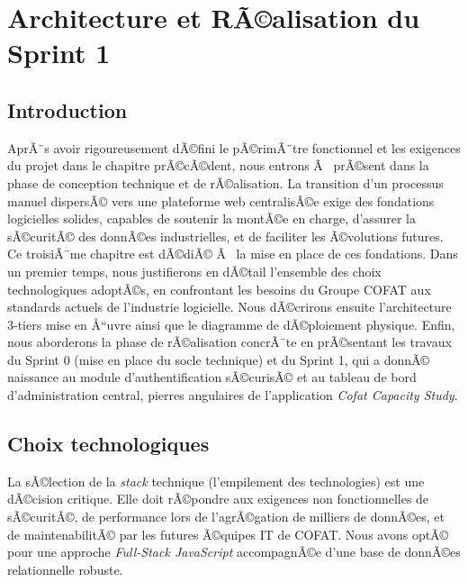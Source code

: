 ﻿\chapter{Architecture et RÃ©alisation du Sprint 1}
\label{chap:architecture_sprint1}

\section{Introduction}
AprÃ¨s avoir rigoureusement dÃ©fini le pÃ©rimÃ¨tre fonctionnel et les exigences du projet dans le chapitre prÃ©cÃ©dent, nous entrons Ã  prÃ©sent dans la phase de conception technique et de rÃ©alisation. La transition d'un processus manuel dispersÃ© vers une plateforme web centralisÃ©e exige des fondations logicielles solides, capables de soutenir la montÃ©e en charge, d'assurer la sÃ©curitÃ© des donnÃ©es industrielles, et de faciliter les Ã©volutions futures. Ce troisiÃ¨me chapitre est dÃ©diÃ© Ã  la mise en place de ces fondations. Dans un premier temps, nous justifierons en dÃ©tail l'ensemble des choix technologiques adoptÃ©s, en confrontant les besoins du Groupe COFAT aux standards actuels de l'industrie logicielle. Nous dÃ©crirons ensuite l'architecture 3-tiers mise en Å“uvre ainsi que le diagramme de dÃ©ploiement physique. Enfin, nous aborderons la phase de rÃ©alisation concrÃ¨te en prÃ©sentant les travaux du Sprint 0 (mise en place du socle technique) et du Sprint 1, qui a donnÃ© naissance au module d'authentification sÃ©curisÃ© et au tableau de bord d'administration central, pierres angulaires de l'application \textit{Cofat Capacity Study}.

\section{Choix technologiques}
La sÃ©lection de la \textit{stack} technique (l'empilement des technologies) est une dÃ©cision critique. Elle doit rÃ©pondre aux exigences non fonctionnelles de sÃ©curitÃ©, de performance lors de l'agrÃ©gation de milliers de donnÃ©es, et de maintenabilitÃ© par les futures Ã©quipes IT de COFAT. Nous avons optÃ© pour une approche \textit{Full-Stack JavaScript} accompagnÃ©e d'une base de donnÃ©es relationnelle robuste.

